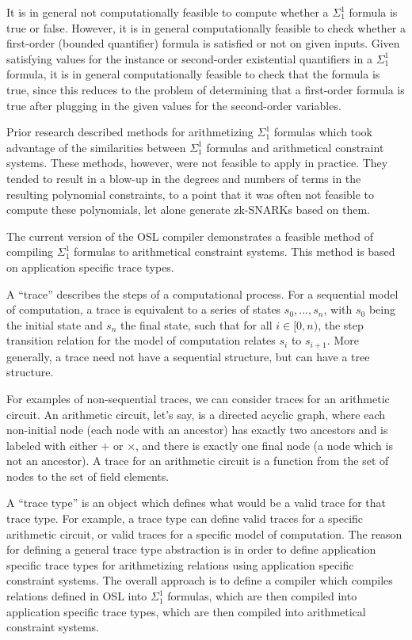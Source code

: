 \documentclass[11pt]{article}
\begin{document}
It is in general not computationally feasible to compute whether a $\Sigma^1_1$ formula is true or false. However, it is in general computationally feasible to check whether a first-order (bounded quantifier) formula is satisfied or not on given inputs. Given satisfying values for the instance or second-order existential quantifiers in a $\Sigma^1_1$ formula, it is in general computationally feasible to check that the formula is true, since this reduces to the problem of determining that a first-order formula is true after plugging in the given values for the second-order variables.

Prior research \cite{sigma11,sigma11-poly-bounds} described methods for arithmetizing $\Sigma^1_1$ formulas which took advantage of the similarities between $\Sigma^1_1$ formulas and arithmetical constraint systems. These methods, however, were not feasible to apply in practice. They tended to result in a blow-up in the degrees and numbers of terms in the resulting polynomial constraints, to a point that it was often not feasible to compute these polynomials, let alone generate zk-SNARKs based on them.

The current version of the OSL compiler \cite{osl-github} demonstrates a feasible method of compiling $\Sigma^1_1$ formulas to arithmetical constraint systems. This method is based on application specific trace types.

A ``trace'' describes the steps of a computational process. For a sequential model of computation, a trace is equivalent to a series of states $s_0, ..., s_n$, with $s_0$ being the initial state and $s_n$ the final state, such that for all $i \in [0,n)$, the step transition relation for the model of computation relates $s_i$ to $s_{i+1}$. More generally, a trace need not have a sequential structure, but can have a tree structure.

For examples of non-sequential traces, we can consider traces for an arithmetic circuit. An arithmetic circuit, let's say, is a directed acyclic graph, where each non-initial node (each node with an ancestor) has exactly two ancestors and is labeled with either $+$ or $\times$, and there is exactly one final node (a node which is not an ancestor). A trace for an arithmetic circuit is a function from the set of nodes to the set of field elements.

A ``trace type'' is an object which defines what would be a valid trace for that trace type. For example, a trace type can define valid traces for a specific arithmetic circuit, or valid traces for a specific model of computation. The reason for defining a general trace type abstraction is in order to define application specific trace types for arithmetizing relations using application specific constraint systems. The overall approach is to define a compiler which compiles relations defined in OSL into $\Sigma^1_1$ formulas, which are then compiled into application specific trace types, which are then compiled into arithmetical constraint systems.
\end{document}
